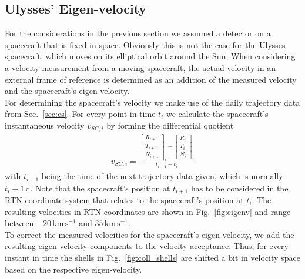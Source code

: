 \subsection{Ulysses' Eigen-velocity}
For the considerations in the previous section we assumed a detector on a spacecraft that is fixed in space. Obviously this is not the case for the Ulysses spacecraft,  which moves on its elliptical orbit around the Sun. When considering a velocity measurement from a moving spacecraft, the actual velocity in an external frame of reference is determined as an addition of the measured velocity and the spacecraft's eigen-velocity.\\
For determining the spacecraft's velocity we make use of the daily trajectory data from Sec.~\ref{sec:cs}. For every point in time $t_i$ we calculate the spacecraft's instantaneous velocity $v_{SC,i}$ by forming the differential quotient 
\begin{align*}
v_{SC,i} = \frac{ \begin{bmatrix}R_{i+1}\\T_{i+1}\\N_{i+1}\end{bmatrix}_i  - \begin{bmatrix}R_{i}\\T_{i}\\N_{i}\end{bmatrix}_i} {t_{i+1} - t_i}
\end{align*}
with $t_{i+1}$ being the time of the next trajectory data given, which is normally $t_i + 1\,\mathrm{d}$. Note that the spacecraft's position at $t_{i+1}$ has to be considered in the RTN coordinate system that relates to the spacecraft's position at $t_i$. The resulting velocities in RTN coordinates are shown in Fig.~\ref{fig:eigenv} and range between $-20\,\mathrm{km\,s^{-1}}$ and $35\,\mathrm{km\,s^{-1}}$.
\\
To correct the measured velocities for the spacecraft's eigen-velocity, we add the resulting eigen-velocity components to the velocity acceptance. Thus, for every instant in time the shells in Fig.~\ref{fig:coll_shells} are shifted a bit in velocity space based on the respective eigen-velocity.


